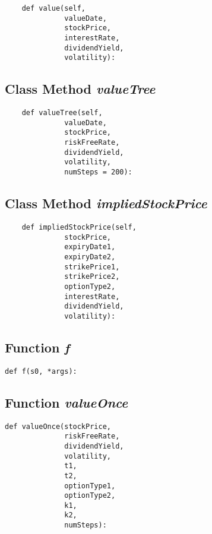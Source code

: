 \documentclass[twoside,11pt]{book}
\begin{document}
\begin{lstlisting}
    def value(self,
              valueDate,
              stockPrice,
              interestRate,
              dividendYield,
              volatility):
\end{lstlisting}

\subsection{Class Method {\it valueTree}}


\begin{lstlisting}
    def valueTree(self,
              valueDate,
              stockPrice,
              riskFreeRate,
              dividendYield,
              volatility,
              numSteps = 200):
\end{lstlisting}

\subsection{Class Method {\it impliedStockPrice}}


\begin{lstlisting}
    def impliedStockPrice(self,
              stockPrice,
              expiryDate1,
              expiryDate2,
              strikePrice1, 
              strikePrice2, 
              optionType2,
              interestRate, 
              dividendYield, 
              volatility):
\end{lstlisting}

\subsection{Function {\it f}}


\begin{lstlisting}
def f(s0, *args):
\end{lstlisting}

\subsection{Function {\it valueOnce}}


\begin{lstlisting}
def valueOnce(stockPrice,
              riskFreeRate,
              dividendYield,
              volatility,
              t1,
              t2,
              optionType1,
              optionType2,
              k1,
              k2,
              numSteps):
\end{lstlisting}
\end{document}
